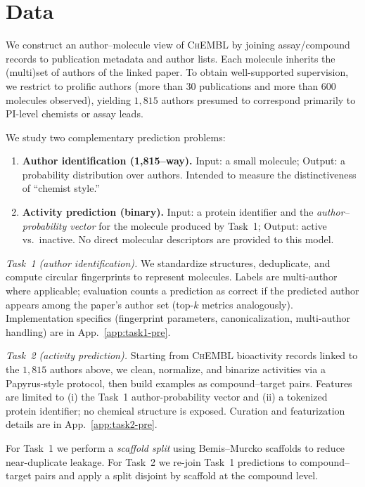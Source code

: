 \documentclass[11pt]{article}
\begin{document}
\section{Data}\label{sec:data}

We construct an author--molecule view of \textsc{ChEMBL} by joining assay/compound records to publication metadata and author lists. Each molecule inherits the (multi)set of authors of the linked paper. To obtain well-supported supervision, we restrict to prolific authors (more than 30 publications and more than 600 molecules observed), yielding $1{,}815$ authors presumed to correspond primarily to PI-level chemists or assay leads.

We study two complementary prediction problems:
\begin{enumerate}[leftmargin=1.5em, itemsep=0.25em]
    \item \textbf{Author identification (1{,}815--way).} Input: a small molecule; Output: a probability distribution over authors. Intended to measure the distinctiveness of ``chemist style.''
    \item \textbf{Activity prediction (binary).} Input: a protein identifier and the \emph{author--probability vector} for the molecule produced by Task~1; Output: active vs.\ inactive. No direct molecular descriptors are provided to this model.
\end{enumerate}

\emph{Task~1 (author identification).} We standardize structures, deduplicate, and compute circular fingerprints to represent molecules. Labels are multi-author where applicable; evaluation counts a prediction as correct if the predicted author appears among the paper’s author set (top-$k$ metrics analogously). Implementation specifics (fingerprint parameters, canonicalization, multi-author handling) are in App.~\ref{app:task1-pre}.

\emph{Task~2 (activity prediction).} Starting from \textsc{ChEMBL} bioactivity records linked to the $1{,}815$ authors above, we clean, normalize, and binarize activities via a Papyrus-style protocol, then build examples as compound--target pairs. Features are limited to (i) the Task~1 author-probability vector and (ii) a tokenized protein identifier; no chemical structure is exposed. Curation and featurization details are in App.~\ref{app:task2-pre}.

For Task~1 we perform a \emph{scaffold split} using Bemis--Murcko scaffolds to reduce near-duplicate leakage. For Task~2 we re-join Task~1 predictions to compound--target pairs and apply a split disjoint by scaffold at the compound level. 
\end{document}

